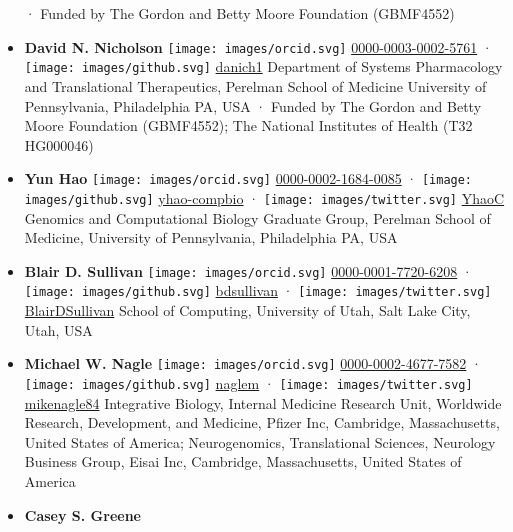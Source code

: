 \begin{itemize}
  · Funded by The Gordon and Betty Moore Foundation (GBMF4552)
\item
  \textbf{David N. Nicholson}
  \texttt{[image: images/orcid.svg]}
  \href{https://orcid.org/0000-0003-0002-5761}{0000-0003-0002-5761}
  · \texttt{[image: images/github.svg]}
  \href{https://github.com/danich1}{danich1}
  Department of Systems Pharmacology and Translational Therapeutics, Perelman School of Medicine University of Pennsylvania, Philadelphia PA, USA
  · Funded by The Gordon and Betty Moore Foundation (GBMF4552); The National Institutes of Health (T32 HG000046)
\item
  \textbf{Yun Hao}
  \texttt{[image: images/orcid.svg]}
  \href{https://orcid.org/0000-0002-1684-0085}{0000-0002-1684-0085}
  · \texttt{[image: images/github.svg]}
  \href{https://github.com/yhao-compbio}{yhao-compbio}
  · \texttt{[image: images/twitter.svg]}
  \href{https://twitter.com/YhaoC}{YhaoC}
  Genomics and Computational Biology Graduate Group, Perelman School of Medicine, University of Pennsylvania, Philadelphia PA, USA
\item
  \textbf{Blair D. Sullivan}
  \texttt{[image: images/orcid.svg]}
  \href{https://orcid.org/0000-0001-7720-6208}{0000-0001-7720-6208}
  · \texttt{[image: images/github.svg]}
  \href{https://github.com/bdsullivan}{bdsullivan}
  · \texttt{[image: images/twitter.svg]}
  \href{https://twitter.com/BlairDSullivan}{BlairDSullivan}
  School of Computing, University of Utah, Salt Lake City, Utah, USA
\item
  \textbf{Michael W. Nagle}
  \texttt{[image: images/orcid.svg]}
  \href{https://orcid.org/0000-0002-4677-7582}{0000-0002-4677-7582}
  · \texttt{[image: images/github.svg]}
  \href{https://github.com/naglem}{naglem}
  · \texttt{[image: images/twitter.svg]}
  \href{https://twitter.com/mikenagle84}{mikenagle84}
  Integrative Biology, Internal Medicine Research Unit, Worldwide Research, Development, and Medicine, Pfizer Inc, Cambridge, Massachusetts, United States of America; Neurogenomics, Translational Sciences, Neurology Business Group, Eisai Inc, Cambridge, Massachusetts, United States of America
\item
  \textbf{Casey S. Greene}

\end{itemize}
